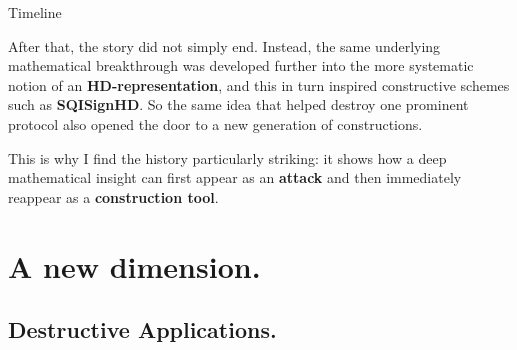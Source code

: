 \documentclass[aspectratio=169,notheorems]{beamer}
\begin{document}
\begin{frame}{Timeline}
{			After that, the story did not simply end. Instead, the same underlying mathematical breakthrough was developed further into the more systematic notion of an \textbf{HD-representation}, and this in turn inspired constructive schemes such as \textbf{SQISignHD}. So the same idea that helped destroy one prominent protocol also opened the door to a new generation of constructions. 
			
			This is why I find the history particularly striking: it shows how a deep mathematical insight can first appear as an \textbf{attack} and then immediately reappear as a \textbf{construction tool}.
		}
	\end{frame}
	
	\section{A new dimension.}
	
	\subsection{Destructive Applications.}
	
\end{document}
